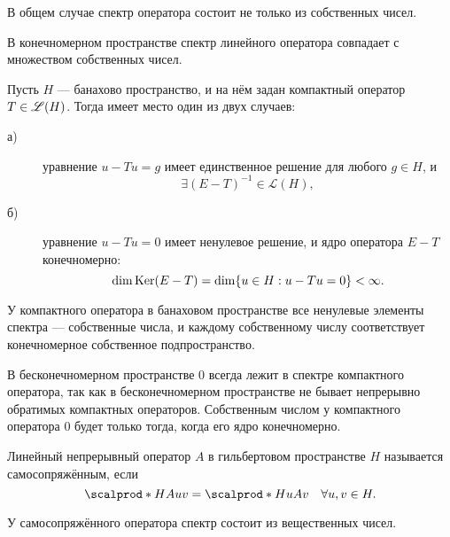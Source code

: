 \begin{note}
В общем случае спектр оператора состоит не только из собственных чисел.
\end{note}

\begin{note}
В конечномерном пространстве спектр линейного оператора совпадает с множеством собственных чисел.
\end{note}


\begin{theorem}[Фредгольм]
Пусть $H$ --- банахово пространство, и на нём задан компактный оператор $T \in \mathscr{L}(H)$. Тогда имеет место один из двух случаев:
\begin{description}
\item [а)] уравнение $u - Tu = g$ имеет единственное решение для любого $g \in H$, и $$ \exists (E -T)^{-1} \in \mathscr{L}(H),$$
\item [б)] уравнение $u - Tu = 0$ имеет ненулевое решение, и ядро оператора $E-T$  конечномерно:
$$\dim \operatorname{Ker}(E-T) = \dim \{ u \in H : u - Tu = 0\} < \infty.$$
\end{description}
\end{theorem}

\begin{corollary}
У компактного оператора в банаховом пространстве все ненулевые элементы спектра --- собственные числа, и каждому собственному числу соответствует конечномерное собственное подпространство.
\end{corollary}

\begin{note}
В бесконечномерном пространстве $0$ всегда лежит в спектре компактного оператора, так как в бесконечномерном пространстве не бывает непрерывно обратимых компактных операторов. Собственным числом у компактного оператора $0$ будет только тогда, когда его ядро конечномерно.
\end{note}

\begin{definition}
Линейный непрерывный оператор $A$ в гильбертовом пространстве $H$ называется самосопряжённым, если
$$ \scalprod*{H}{Au}{v} = \scalprod*{H}{u}{Av} \quad \forall u,v \in H.$$
\end{definition}

\begin{note}
У самосопряжённого оператора спектр состоит из вещественных чисел.
\end{note}

